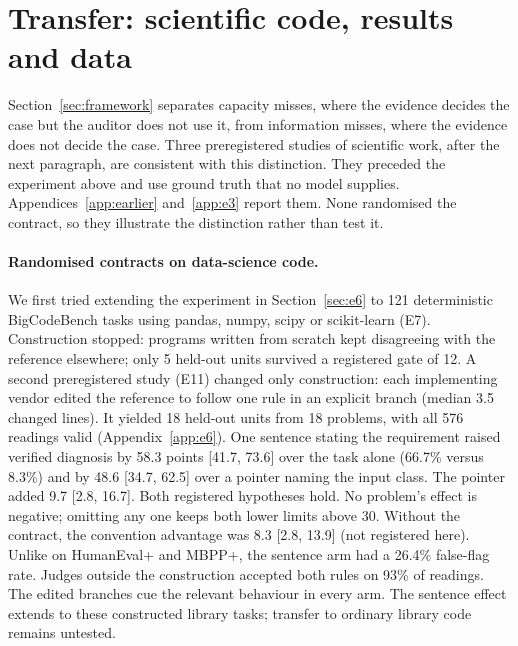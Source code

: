 \section{Transfer: scientific code, results and data}
\label{sec:transfer}

Section~\ref{sec:framework} separates capacity misses, where the evidence decides the case but the auditor does
not use it, from information misses, where the evidence does not decide the case. Three preregistered studies of
scientific work, after the next paragraph, are consistent with this distinction. They preceded the experiment above and use ground truth that no
model supplies. Appendices~\ref{app:earlier} and~\ref{app:e3} report them. None randomised the contract, so they illustrate the
distinction rather than test it.

\paragraph{Randomised contracts on data-science code.} We first tried extending the experiment in
Section~\ref{sec:e6} to 121 deterministic BigCodeBench tasks using pandas, numpy, scipy or scikit-learn (E7).
Construction stopped: programs written from scratch kept disagreeing with the reference elsewhere; only 5
held-out units survived a registered gate of 12. A second preregistered study (E11) changed only construction:
each implementing vendor edited the reference to follow one rule in an explicit branch (median 3.5 changed lines).
It yielded 18 held-out units from 18 problems, with all 576 readings valid (Appendix~\ref{app:e6}).
One sentence stating the requirement raised verified diagnosis by 58.3 points [41.7, 73.6] over the task alone
(66.7\% versus 8.3\%) and by 48.6 [34.7, 62.5] over a pointer naming the input class.
The pointer added 9.7 [2.8, 16.7]. Both registered hypotheses hold. No problem's effect is negative;
omitting any one keeps both lower limits above 30. Without the contract, the convention advantage was
8.3 [2.8, 13.9] (not registered here). Unlike on HumanEval+ and MBPP+, the sentence arm had a 26.4\% false-flag rate.
Judges outside the construction accepted both rules on 93\% of readings. The edited branches cue the relevant
behaviour in every arm. The sentence effect extends to these constructed library tasks;
transfer to ordinary library code remains untested.

